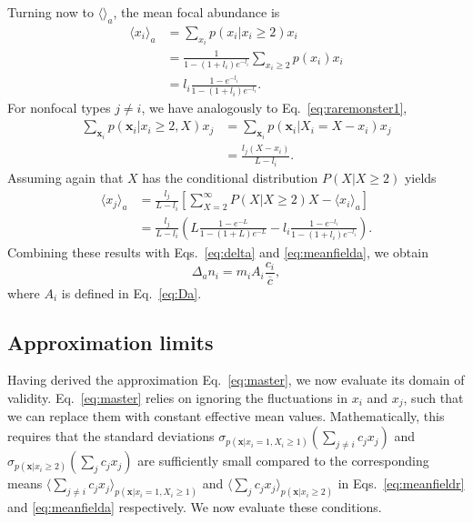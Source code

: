\documentclass[12pt]{article}
\begin{document}
Turning now to $\langle \rangle_a$, the mean focal abundance is 
\begin{align}
\langle x_i \rangle_{a}&=\sum_{x_i} p(x_i|x_i\geq 2)x_i \nonumber\\
&=\frac{1}{1-(1+l_i)e^{-l_i}}\sum_{x_i\geq 2} p(x_i)x_i\nonumber\\
&=l_i\frac{1-e^{-l_i}}{1-(1+l_i)e^{-l_i}}.
\end{align}
For nonfocal types $j\neq i$, we have analogously to Eq.~\eqref{eq:raremonster1},
\begin{align}
\sum_{\mathbf x_i}  p(\mathbf x_i|x_i\geq 2,X) x_j&= \sum_{\mathbf x_i}  p(\mathbf x_i|X_i=X-x_i) x_j\nonumber\\
&= \frac{l_j(X-x_i)}{L-l_i}.
\end{align}
Assuming again that $X$ has the conditional distribution $P(X|X\geq 2)$ yields 
\begin{align}
\langle x_j \rangle_a&=\frac{l_j}{L-l_i}\left[\sum_{X=2}^{\infty}P(X|X\geq 2)X - \langle x_i \rangle_a \right]\nonumber\\
&=\frac{l_j}{L-l_i}\left( L\frac{1-e^{-L}}{1-(1+L)e^{-L}}- l_i\frac{1-e^{-l_i}}{1-(1+l_i)e^{-l_i}}\right).
\end{align}
Combining these results with Eqs.~\eqref{eq:delta} and \eqref{eq:meanfielda}, we obtain
\begin{equation}
\Delta_a n_i=m_i A_i \frac{c_i}{\overline{c}},
\end{equation}
where $A_i$ is defined in Eq.~\eqref{eq:Da}.

\subsection*{Approximation limits}

Having derived the approximation Eq.~\eqref{eq:master}, we now evaluate its domain of validity. Eq.~\eqref{eq:master} relies on ignoring the fluctuations in $x_i$ and $x_j$, such that we can replace them with constant effective mean values. Mathematically, this requires that the standard deviations $\sigma_{p({\mathbf x}|x_i=1,X_i\geq 1)}(\sum_{j\neq i} c_j x_j)$ and $\sigma_{p({\mathbf x}|x_i\geq 2)}(\sum_j c_j x_j)$ are sufficiently small compared to the corresponding means $\langle\sum_{j\neq i} c_j x_j\rangle_{p({\mathbf x}|x_i=1,X_i\geq 1)}$ and $\langle\sum_j c_j x_j\rangle_{p({\mathbf x}|x_i\geq 2)}$ in Eqs.~\eqref{eq:meanfieldr} and \eqref{eq:meanfielda} respectively. We now evaluate these conditions.
\end{document}
